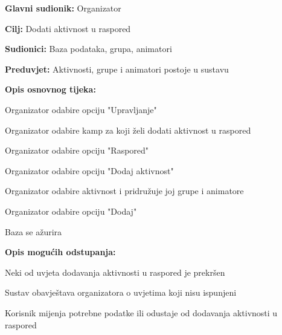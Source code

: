 					\noindent {}
					\begin{packed_item}
						
						\item \textbf{Glavni sudionik: } Organizator
						\item  \textbf{Cilj:} Dodati aktivnost u raspored
						\item  \textbf{Sudionici:} Baza podataka, grupa, animatori
						\item  \textbf{Preduvjet:} Aktivnosti, grupe i animatori postoje u sustavu
						\item  \textbf{Opis osnovnog tijeka:}
						
						\item[] \begin{packed_enum}
							
							\item Organizator odabire opciju "Upravljanje"
							\item Organizator odabire kamp za koji želi dodati aktivnost u raspored
							\item Organizator odabire opciju "Raspored"
							\item Organizator odabire opciju "Dodaj aktivnost"
							\item Organizator odabire aktivnost i pridružuje joj grupe i animatore
							\item Organizator odabire opciju "Dodaj"
							\item Baza se ažurira
						\end{packed_enum}
						
						\item  \textbf{Opis mogućih odstupanja:}
						
						\item[] \begin{packed_item}
							
							\item[5.a] Neki od uvjeta dodavanja aktivnosti u raspored je prekršen
							\item[] \begin{packed_enum}
								
								\item Sustav obavještava organizatora o uvjetima koji nisu ispunjeni
								\item Korisnik mijenja potrebne podatke ili odustaje od 
								dodavanja aktivnosti u raspored
								
							\end{packed_enum}			
						\end{packed_item}
					\end{packed_item}
				
